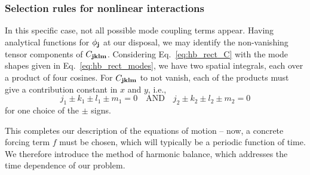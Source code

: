 \subsubsection{Selection rules for nonlinear interactions}

In this specific case, not all possible mode coupling terms appear. Having analytical functions for $\phi_{\vb{j}}$ at our disposal, we may identify the non-vanishing tensor components of $C_{\vb{j} \vb{k} \vb{l} \vb{m}}$. Considering Eq.~\eqref{eq:hb_rect_C} with the mode shapes given in Eq.~\eqref{eq:hb_rect_modes}, we have two spatial integrals, each over a product of four cosines. For $C_{\vb{j} \vb{k} \vb{l} \vb{m}}$ to not vanish, each of the products must give a contribution constant in $x$ and $y$, i.e.,
\begin{equation}
j_1 \pm k_1 \pm l_1 \pm m_1 = 0  \quad \text{AND} \quad j_2 \pm k_2 \pm l_2 \pm m_2 = 0 
\end{equation}
for one choice of the $\pm$ signs.

This completes our description of the equations of motion -- now, a concrete forcing term $f$ must be chosen, which will typically be a periodic function of time. We therefore introduce the method of harmonic balance, which addresses the time dependence of our problem.


